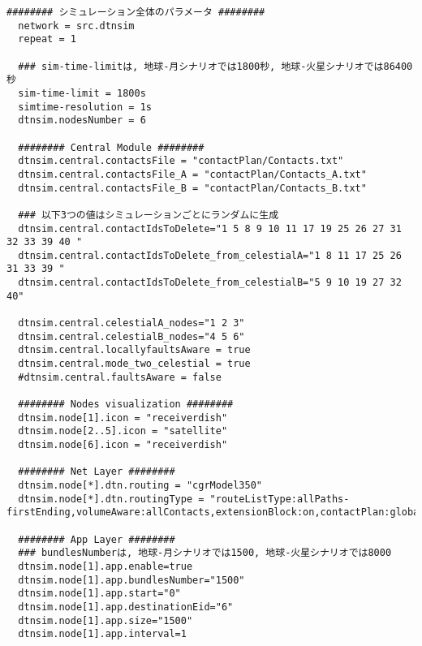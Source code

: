 
\begin{lstlisting}[caption=シミュレーションに用いたinifileの例,label=inifile,]
  ######## シミュレーション全体のパラメータ ########
  network = src.dtnsim										
  repeat = 1
  
  ### sim-time-limitは, 地球-月シナリオでは1800秒, 地球-火星シナリオでは86400秒
  sim-time-limit = 1800s 
  simtime-resolution = 1s
  dtnsim.nodesNumber = 6

  ######## Central Module ########
  dtnsim.central.contactsFile = "contactPlan/Contacts.txt"
  dtnsim.central.contactsFile_A = "contactPlan/Contacts_A.txt"
  dtnsim.central.contactsFile_B = "contactPlan/Contacts_B.txt"
  
  ### 以下3つの値はシミュレーションごとにランダムに生成
  dtnsim.central.contactIdsToDelete="1 5 8 9 10 11 17 19 25 26 27 31 32 33 39 40 "
  dtnsim.central.contactIdsToDelete_from_celestialA="1 8 11 17 25 26 31 33 39 "
  dtnsim.central.contactIdsToDelete_from_celestialB="5 9 10 19 27 32 40"
  
  dtnsim.central.celestialA_nodes="1 2 3"
  dtnsim.central.celestialB_nodes="4 5 6"
  dtnsim.central.locallyfaultsAware = true
  dtnsim.central.mode_two_celestial = true
  #dtnsim.central.faultsAware = false
  
  ######## Nodes visualization ########
  dtnsim.node[1].icon = "receiverdish"
  dtnsim.node[2..5].icon = "satellite"
  dtnsim.node[6].icon = "receiverdish"
  
  ######## Net Layer ########
  dtnsim.node[*].dtn.routing = "cgrModel350"
  dtnsim.node[*].dtn.routingType = "routeListType:allPaths-firstEnding,volumeAware:allContacts,extensionBlock:on,contactPlan:global"
  
  ######## App Layer ########
  ### bundlesNumberは, 地球-月シナリオでは1500, 地球-火星シナリオでは8000
  dtnsim.node[1].app.enable=true
  dtnsim.node[1].app.bundlesNumber="1500"　
  dtnsim.node[1].app.start="0"			 
  dtnsim.node[1].app.destinationEid="6"
  dtnsim.node[1].app.size="1500"
  dtnsim.node[1].app.interval=1
  
\end{lstlisting}